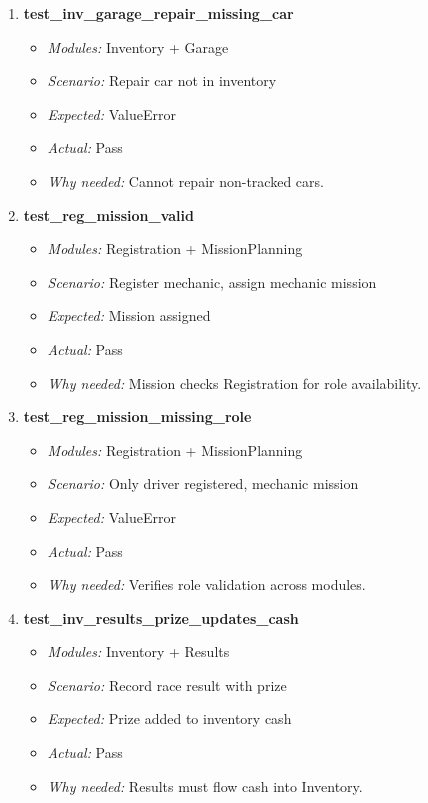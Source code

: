 \documentclass{article}
\begin{document}
\begin{enumerate}[resume, label=\textbf{TC\arabic*.}]
\item \textbf{test\_inv\_garage\_repair\_missing\_car}
\begin{itemize}[noitemsep]
  \item \textit{Modules:} Inventory + Garage
  \item \textit{Scenario:} Repair car not in inventory
  \item \textit{Expected:} ValueError
  \item \textit{Actual:} Pass
  \item \textit{Why needed:} Cannot repair non-tracked cars.
\end{itemize}

\item \textbf{test\_reg\_mission\_valid}
\begin{itemize}[noitemsep]
  \item \textit{Modules:} Registration + MissionPlanning
  \item \textit{Scenario:} Register mechanic, assign mechanic mission
  \item \textit{Expected:} Mission assigned
  \item \textit{Actual:} Pass
  \item \textit{Why needed:} Mission checks Registration for role availability.
\end{itemize}

\item \textbf{test\_reg\_mission\_missing\_role}
\begin{itemize}[noitemsep]
  \item \textit{Modules:} Registration + MissionPlanning
  \item \textit{Scenario:} Only driver registered, mechanic mission
  \item \textit{Expected:} ValueError
  \item \textit{Actual:} Pass
  \item \textit{Why needed:} Verifies role validation across modules.
\end{itemize}

\item \textbf{test\_inv\_results\_prize\_updates\_cash}
\begin{itemize}[noitemsep]
  \item \textit{Modules:} Inventory + Results
  \item \textit{Scenario:} Record race result with prize
  \item \textit{Expected:} Prize added to inventory cash
  \item \textit{Actual:} Pass
  \item \textit{Why needed:} Results must flow cash into Inventory.
\end{itemize}


\end{enumerate}
\end{document}
